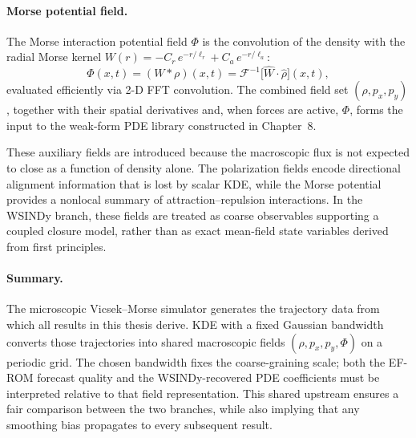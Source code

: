 \paragraph{Morse potential field.}
The Morse interaction potential field $\Phi$ is the convolution
of the density with the radial Morse kernel
$W(r) = -C_r\,e^{-r/\ell_r} + C_a\,e^{-r/\ell_a}$:
\begin{equation}
\Phi(x,t)
=
(W * \rho)(x,t)
=
\mathcal{F}^{-1}\!\bigl[\hat W \cdot \hat\rho\bigr](x,t),
\label{eq:morse_potential_field}
\end{equation}
evaluated efficiently via 2-D FFT convolution.
The combined field set $(\rho, p_x, p_y)$, together with their spatial
derivatives and, when forces are active, $\Phi$, forms the input to the
weak-form PDE library constructed in Chapter~8.

These auxiliary fields are introduced because the macroscopic flux is not
expected to close as a function of density alone.  The polarization fields
encode directional alignment information that is lost by scalar KDE, while
the Morse potential provides a nonlocal summary of attraction--repulsion
interactions.  In the WSINDy branch, these fields are treated as
coarse observables supporting a coupled closure model, rather than as exact
mean-field state variables derived from first principles.

\paragraph{Summary.}
The microscopic Vicsek--Morse simulator generates the trajectory data
from which all results in this thesis derive.  KDE with a fixed Gaussian
bandwidth converts those trajectories into shared macroscopic fields
$(\rho, p_x, p_y, \Phi)$ on a periodic grid.  The chosen bandwidth
fixes the coarse-graining scale; both the EF-ROM forecast quality and
the WSINDy-recovered PDE coefficients must be interpreted relative to
that field representation.  This shared upstream ensures a fair
comparison between the two branches, while also implying that any
smoothing bias propagates to every subsequent result.
